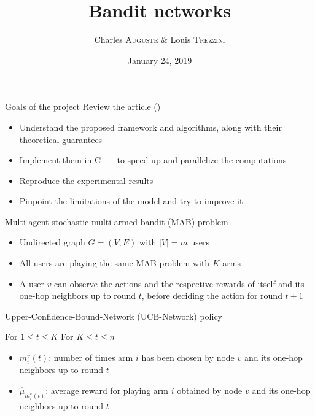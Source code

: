 \documentclass{beamer}
\title{Bandit networks}
\date{January 24, 2019}
\author{Charles \textsc{Auguste} \& Louis \textsc{Trezzini}}
\begin{document}
\maketitle

\begin{frame}{Goals of the project}
Review the article  (\citeauthor{DBLP:journals/corr/KollaJG16})

\begin{itemize}
  \item Understand the proposed framework and algorithms, along with their theoretical guarantees
  \item Implement them in C++ to speed up and parallelize the computations
  \item Reproduce the experimental results
  \item Pinpoint the limitations of the model and try to improve it
\end{itemize}
\end{frame}

\begin{frame}{Multi-agent stochastic multi-armed bandit (MAB) problem}
\begin{itemize}
  \item Undirected graph $G = (V, E)$ with $|V| = m$ users
  \item All users are playing the \alert{same} MAB problem with $K$ arms
  \item A user $v$ can observe the actions and the respective rewards of itself and its \alert{one-hop neighbors up to round $t$}, before deciding the action for round $t + 1$
\end{itemize}

\end{frame}

\begin{frame}{Upper-Confidence-Bound-Network (UCB-Network) policy}
  \begin{algorithm}[H]
    \caption{Upper-Confidence-Bound-Network (UCB-Network)}
    \begin{algorithmic}
        For $1 \leq t \leq K$
        For $K \leq t \leq n$
    \end{algorithmic}
  \end{algorithm}

  \begin{itemize}
    \item $m^v_i(t)$: number of times arm $i$ has been chosen by node $v$ and its one-hop neighbors up to round $t$
    \item $\hat{\mu}_{m_i^v(t)}$: average reward for playing arm $i$ obtained by node $v$ and its one-hop neighbors up to round $t$
  \end{itemize}
\end{frame}
\end{document}
